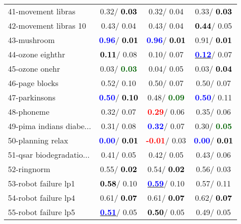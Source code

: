 \begin{table}[h]
\begin{center}
\begin{tabular}{lc|c|c}
41-movement libras &   0.32/\textcolor{black}{\textbf{  0.03}} &   0.32/  0.04 &   0.33/\textcolor{black}{\textbf{  0.03}} \\
42-movement libras 10 &   0.43/  0.04 &   0.43/  0.04 & \textcolor{black}{\textbf{  0.44}}/  0.05 \\
43-mushroom & \textcolor{blue}{\textbf{  0.96}}/\textcolor{black}{\textbf{  0.01}} & \textcolor{blue}{\textbf{  0.96}}/\textcolor{black}{\textbf{  0.01}} &   0.91/\textcolor{black}{\textbf{  0.01}} \\
44-ozone eighthr & \textcolor{black}{\textbf{  0.11}}/  0.08 &   0.10/  0.07 & \underline{\textcolor{blue}{\textbf{  0.12}}}/  0.07 \\
45-ozone onehr &   0.03/\textcolor{darkgreen}{\textbf{  0.03}} &   0.04/  0.05 &   0.03/\textcolor{black}{\textbf{  0.04}} \\
46-page blocks &   0.52/  0.10 &   0.50/  0.07 &   0.50/  0.07 \\ \hline
47-parkinsons & \textcolor{blue}{\textbf{  0.50}}/\textcolor{black}{\textbf{  0.10}} &   0.48/\textcolor{darkgreen}{\textbf{  0.09}} & \textcolor{blue}{\textbf{  0.50}}/  0.11 \\
48-phoneme &   0.32/  0.07 & \textcolor{red}{\textbf{  0.29}}/  0.06 &   0.35/  0.06 \\
49-pima indians diabe... &   0.31/  0.08 & \textcolor{blue}{\textbf{  0.32}}/  0.07 &   0.30/\textcolor{darkgreen}{\textbf{  0.05}} \\
50-planning relax & \textcolor{blue}{\textbf{  0.00}}/\textcolor{black}{\textbf{  0.01}} & \textcolor{red}{\textbf{ -0.01}}/  0.03 & \textcolor{blue}{\textbf{  0.00}}/\textcolor{black}{\textbf{  0.01}} \\
51-qsar biodegradatio... &   0.41/  0.05 &   0.42/  0.05 &   0.43/  0.06 \\
52-ringnorm &   0.55/\textcolor{black}{\textbf{  0.02}} &   0.54/\textcolor{black}{\textbf{  0.02}} &   0.56/  0.03 \\
53-robot failure lp1 & \textcolor{black}{\textbf{  0.58}}/  0.10 & \underline{\textcolor{blue}{\textbf{  0.59}}}/  0.10 &   0.57/  0.11 \\ \hline
54-robot failure lp4 &   0.61/\textcolor{black}{\textbf{  0.07}} &   0.61/\textcolor{black}{\textbf{  0.07}} &   0.62/\textcolor{black}{\textbf{  0.07}} \\
55-robot failure lp5 & \underline{\textcolor{blue}{\textbf{  0.51}}}/  0.05 & \textcolor{black}{\textbf{  0.50}}/  0.05 &   0.49/  0.05 \\

\end{tabular}
\end{center}
\end{table}
